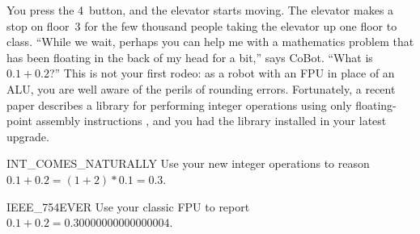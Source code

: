 You press the 4~button, and the elevator starts moving.
The elevator makes a stop on floor~3
for the few thousand people taking the elevator up one floor to class.
``While we wait,
perhaps you can help me with a mathematics problem
that has been floating in the back of my head for a bit,''
says CoBot.
``What is $0.1 + 0.2$?''
This is not your first rodeo:
as a robot with an FPU in place of an ALU,
you are well aware of the perils of rounding errors.
Fortunately, a recent paper describes
a library for performing integer operations
using only floating-point assembly instructions \citep{jim_tom},
and you had the library installed in your latest upgrade.

\begin{switch}
\item{INT\_COMES\_NATURALLY}
  Use your new integer operations to reason
  $0.1 + 0.2 = (1 + 2) * 0.1 = 0.3$.
\item{IEEE\_754EVER}
  Use your classic FPU to report
  $0.1 + 0.2 = 0.30000000000000004$.
\end{switch}


